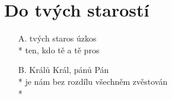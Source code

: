 \section{Do tvých starostí}         %
\begin{enumerate}
\item[A.]  tvých staros  úzkos \\*
 ten, kdo  tě  a  tě pros 
\item[B.] Králů Král, pánů Pán \\*
je nám bez rozdílu všechněm zvěstován \\*
\end{enumerate}

